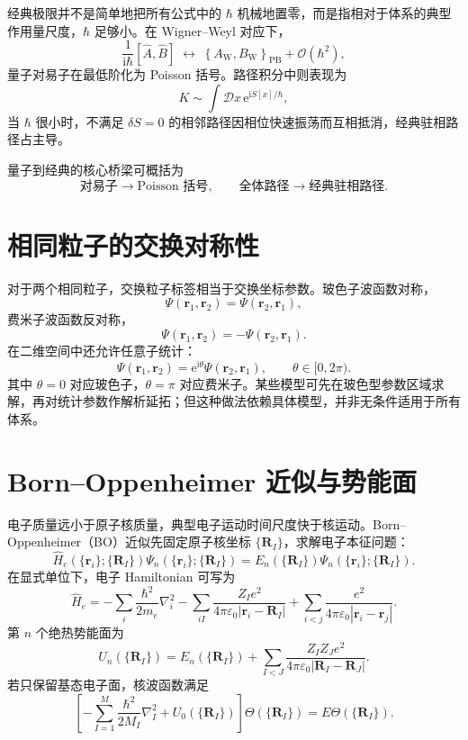 \documentclass[11pt,a4paper,oneside,openany,fontset=fandol]{ctexbook}
\newcommand{\ee}{\mathrm{e}}
\newcommand{\ii}{\mathrm{i}}
\newcommand{\pb}[2]{\left\{#1,#2\right\}_{\mathrm{PB}}}
\newcommand{\vct}[1]{\bm{#1}}
\newcommand{\order}{\mathcal{O}}
\newcommand{\Wig}{\mathrm{W}}
\begin{document}
经典极限并不是简单地把所有公式中的 $\hbar$ 机械地置零，而是指相对于体系的典型作用量尺度，$\hbar$ 足够小。在 Wigner--Weyl 对应下，
\[
\frac{1}{\ii\hbar}[\hat A,\hat B]
\;\longleftrightarrow\;
\pb{A_{\Wig}}{B_{\Wig}}+\order(\hbar^2),
\]
量子对易子在最低阶化为 Poisson 括号。路径积分中则表现为
\[
K\sim\int\mathcal D x\,\ee^{\ii S[x]/\hbar},
\]
当 $\hbar$ 很小时，不满足 $\delta S=0$ 的相邻路径因相位快速振荡而互相抵消，经典驻相路径占主导。

\begin{keybox}
量子到经典的核心桥梁可概括为
\[
\text{对易子}\to\text{Poisson 括号},
\qquad
\text{全体路径}\to\text{经典驻相路径}.
\]
\end{keybox}

\section{相同粒子的交换对称性}

对于两个相同粒子，交换粒子标签相当于交换坐标参数。玻色子波函数对称，
\[
\Psi(\vct r_1,\vct r_2)=\Psi(\vct r_2,\vct r_1),
\]
费米子波函数反对称，
\[
\Psi(\vct r_1,\vct r_2)=-\Psi(\vct r_2,\vct r_1).
\]
在二维空间中还允许任意子统计：
\[
\Psi(\vct r_1,\vct r_2)
=\ee^{\ii\theta}\Psi(\vct r_2,\vct r_1),
\qquad \theta\in[0,2\pi).
\]
其中 $\theta=0$ 对应玻色子，$\theta=\pi$ 对应费米子。某些模型可先在玻色型参数区域求解，再对统计参数作解析延拓；但这种做法依赖具体模型，并非无条件适用于所有体系。

\section{Born--Oppenheimer 近似与势能面}

电子质量远小于原子核质量，典型电子运动时间尺度快于核运动。Born--Oppenheimer（BO）近似先固定原子核坐标 $\{\vct R_I\}$，求解电子本征问题：
\[
\hat H_e\!\left(\{\vct r_i\};\{\vct R_I\}\right)
\Psi_n\!\left(\{\vct r_i\};\{\vct R_I\}\right)
=
E_n\!\left(\{\vct R_I\}\right)
\Psi_n\!\left(\{\vct r_i\};\{\vct R_I\}\right).
\]
在显式单位下，电子 Hamiltonian 可写为
\[
\hat H_e=
-\sum_i\frac{\hbar^2}{2m_e}\nabla_i^2
-\sum_{iI}\frac{Z_Ie^2}{4\pi\varepsilon_0|\vct r_i-\vct R_I|}
+\sum_{i<j}\frac{e^2}{4\pi\varepsilon_0|\vct r_i-\vct r_j|}.
\]
第 $n$ 个绝热势能面为
\[
U_n(\{\vct R_I\})
=
E_n(\{\vct R_I\})
+
\sum_{I<J}
\frac{Z_IZ_Je^2}{4\pi\varepsilon_0|\vct R_I-\vct R_J|}.
\]
若只保留基态电子面，核波函数满足
\[
\left[
-\sum_{I=1}^{M}\frac{\hbar^2}{2M_I}\nabla_I^2
+U_0(\{\vct R_I\})
\right]\Theta(\{\vct R_I\})
=E\Theta(\{\vct R_I\}).
\]
\end{document}
